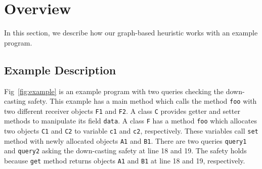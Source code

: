 \section{Overview}
In this section, we describe how our graph-based heuristic works with an example program.


\subsection{Example Description}
\begin{comment}
Fig~\ref{fig:example} shows an example program to illustrates a
graph-based object-sensitivity heuristics which can be obtained from our framework.
For this example, we use allocation-site based heap abstraction that
present each objects with their allocation-site.
This example has a class {\tt C} which provides getter and setter method
to manipulate its field {\tt data}.
A class {\tt F} has a method {\tt foo} which allocates two
objects {\tt C1} and {\tt C2} to variable {\tt c1} and {\tt c2}, respectively.
The variables {\tt c1} and {\tt c2} call {\tt set} method with newly
allocated objects {\tt A1} and {\tt B1}, respectively.
There are two queries {\tt query1} and {\tt query2} asking the
safety of the down castings at line 18 and 19 are safe.
Obviously, the queries are safe in the real execution because {\tt get} method returns objects
{\tt A1} and {\tt B1} at line 18 and 19, respectively.
\end{comment}
Fig~\ref{fig:example} is an example program with two queries checking the down-casting safety.
This example has a main method which calls the method {\tt foo} with two different receiver objects {\tt F1} and {\tt F2}. 
A class {\tt C} provides getter and setter methods to manipulate its field {\tt data}.
A class {\tt F} has a method {\tt foo} which allocates two 
objects {\tt C1} and {\tt C2} to variable {\tt c1} and {\tt c2}, respectively.
These variables call {\tt set} method with newly allocated objects {\tt A1} and {\tt B1}.
There are two queries {\tt query1} and {\tt query2} asking the down-casting safety at line 18 and 19.
The safety holds because {\tt get} method returns objects {\tt A1} and {\tt B1} at line 18 and 19, respectively.



